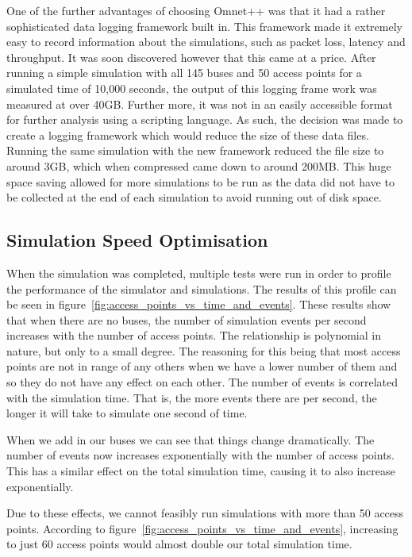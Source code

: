             One of the further advantages of choosing Omnet++ was that it had a rather sophisticated data logging framework built in. This framework made it extremely easy to record information about the simulations, such as packet loss, latency and throughput. It was soon discovered however that this came at a price. After running a simple simulation with all 145 buses and 50 access points for a simulated time of 10,000 seconds, the output of this logging frame work was measured at over 40GB. Further more, it was not in an easily accessible format for further analysis using a scripting language. As such, the decision was made to create a logging framework which would reduce the size of these data files. Running the same simulation with the new framework reduced the file size to around 3GB, which when compressed came down to around 200MB. This huge space saving allowed for more simulations to be run as the data did not have to be collected at the end of each simulation to avoid running out of disk space. 

        \subsection{Simulation Speed Optimisation}\label{simulation_simulator_options_simulation_speed_optimisation}

            When the simulation was completed, multiple tests were run in order to profile the performance of the simulator and simulations. The results of this profile can be seen in figure~\ref{fig:access_points_vs_time_and_events}. These results show that when there are no buses, the number of simulation events per second increases with the number of access points. The relationship is polynomial in nature, but only to a small degree. The reasoning for this being that most access points are not in range of any others when we have a lower number of them and so they do not have any effect on each other. The number of events is correlated with the simulation time. That is, the more events there are per second, the longer it will take to simulate one second of time. 

            When we add in our buses we can see that things change dramatically. The number of events now increases exponentially with the number of access points. This has a similar effect on the total simulation time, causing it to also increase exponentially. 

            Due to these effects, we cannot feasibly run simulations with more than 50 access points. According to figure~\ref{fig:access_points_vs_time_and_events}, increasing to just 60 access points would almost double our total simulation time. 

